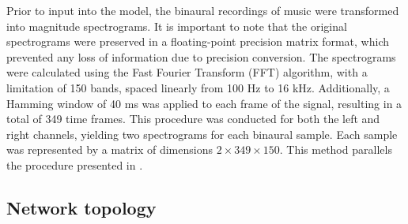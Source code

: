 \documentclass{article}
\begin{document}



Prior to input into the model, the binaural recordings of music were transformed into magnitude spectrograms. It is important to note that the original spectrograms were preserved in a floating-point precision matrix format, which prevented any loss of information due to precision conversion. The spectrograms were calculated using the Fast Fourier Transform (FFT) algorithm, with a limitation of 150 bands, spaced linearly from 100 Hz to 16 kHz. Additionally, a Hamming window of 40 ms was applied to each frame of the signal, resulting in a total of 349 time frames. This procedure was conducted for both the left and right channels, yielding two spectrograms for each binaural sample. Each sample was represented by a matrix of dimensions $2 \times 349 \times 150$. This method parallels the procedure presented in \cite{zielinski_automatic_2022}.

\subsection{Network topology}
\label{subsec:topology}
\end{document}
